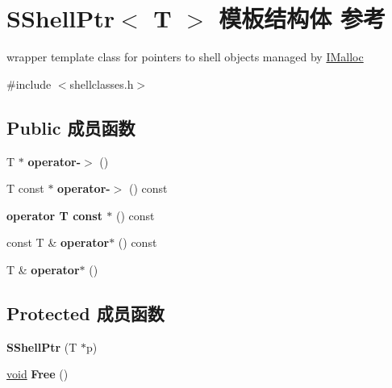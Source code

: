\hypertarget{struct_s_shell_ptr}{}\section{S\+Shell\+Ptr$<$ T $>$ 模板结构体 参考}
\label{struct_s_shell_ptr}


wrapper template class for pointers to shell objects managed by \hyperlink{interface_i_malloc}{I\+Malloc}  




{\ttfamily \#include $<$shellclasses.\+h$>$}

\subsection*{Public 成员函数}
\begin{DoxyCompactItemize}
\item 
\mbox{\label{struct_s_shell_ptr_a6b667f020d9d98a7d6488cd8ff7e6db9}} 
T $\ast$ {\bfseries operator-\/$>$} ()
\item 
\mbox{\label{struct_s_shell_ptr_a165dd0af9f19ce24d12b25a93aaf3bcc}} 
T const  $\ast$ {\bfseries operator-\/$>$} () const
\item 
\mbox{\label{struct_s_shell_ptr_a325aac739f3eb79b092176ed3e189a4b}} 
{\bfseries operator T const $\ast$} () const
\item 
\mbox{\label{struct_s_shell_ptr_a1a09a70c4cf556c9d172b8fd4a409e2d}} 
const T \& {\bfseries operator$\ast$} () const
\item 
\mbox{\label{struct_s_shell_ptr_aa05903480d0c61ffad7a3a13d3630fea}} 
T \& {\bfseries operator$\ast$} ()
\end{DoxyCompactItemize}
\subsection*{Protected 成员函数}
\begin{DoxyCompactItemize}
\item 
\mbox{\label{struct_s_shell_ptr_ada5f951e3a91174dff4534860a51a42d}} 
{\bfseries S\+Shell\+Ptr} (T $\ast$p)
\item 
\mbox{\label{struct_s_shell_ptr_adcb9bb784958e7451d2faa378e68b771}} 
\hyperlink{interfacevoid}{void} {\bfseries Free} ()
\end{DoxyCompactItemize}

